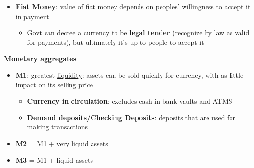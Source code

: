 \documentclass{article}
\begin{document}
\begin{multicols}{2}
\begin{itemize}
    \item \textbf{Fiat Money}: value of fiat money depends on peoples' willingness to accept it in payment
    \begin{itemize}
    	\item Govt can decree a currency to be \textbf{legal tender} (recognize by law as valid for payments), but ultimately it's up to people to accept it
    \end{itemize}
\end{itemize}
\textbf{Monetary aggregates}
\begin{itemize}
	\item \textbf{M1}: greatest \underline{liquidity}: assets can be sold quickly for currency, with as little impact on its selling price
	\begin{itemize}
		\item \textbf{Currency in circulation}: excludes cash in bank vaults and ATMS
		\item \textbf{Demand deposits/Checking Deposits}: deposits that are used for making transactions
	\end{itemize}
    \item \textbf{M2} = M1 + very liquid assets
    \item \textbf{M3} = M1 + liquid assets
\end{itemize}


\end{multicols}
\end{document}
